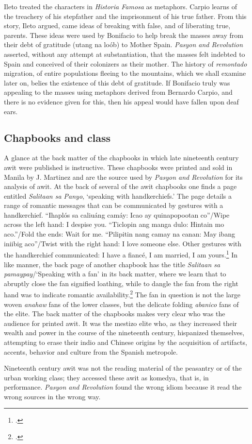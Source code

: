 Ileto treated the characters in \textit{Historia Famosa} as metaphors. Carpio learns of the treachery of his stepfather and the imprisonment of his true father. From this story, Ileto argued, came ideas of breaking with false, and of liberating true, parents. These ideas were used by Bonifacio to help break the masses away from their debt of gratitude (utang na lo\'ob) to Mother Spain. \textit{Pasyon and Revolution} asserted, without any attempt at substantiation, that the masses felt indebted to Spain and conceived of their colonizers as their mother. The history of \textit{remontado} migration, of entire populations fleeing to the mountains, which we shall examine later on, belies the existence of this debt of gratitude. If Bonifacio truly was appealing to the masses using metaphors derived from Bernardo Carpio, and there is no evidence given for this, then his appeal would have fallen upon deaf ears.

\subsection{Chapbooks and class}

A glance at the back matter of the chapbooks in which late nineteenth century awit were published is instructive. These chapbooks were printed and sold in Manila by J. Martinez and are the source used by \textit{Pasyon and Revolution} for its analysis of awit. At the back of several of the awit chapbooks one finds a page entitled \textit{Salitaan sa Panyo}, \enquote*{speaking with handkerchiefs.} The page details a range of romantic messages that can be communicated by gestures with a handkerchief. \enquote{Ihapl\'os sa caliu\'ang cam\'ay: Icao ay quinapopootan co}/Wipe across the left hand: I despise you. \enquote{Ticlopin ang manga dulo: Hintain mo aco.}/Fold the ends: Wait for me. \enquote{Pilipitin nang camay na canan: May ibang iniibig aco}/Twist with the right hand: I love someone else. Other gestures with the handkerchief communicated: I have a fianc\'e, I am married, I am yours.\footcite{Buhay1916}  In like manner, the back page of another chapbook has the title \textit{Salitaan sa pamaypay}/\enquote*{Speaking with a fan} in its back matter, where we learn that to abruptly close the fan signified loathing, while to dangle the fan from the right hand was to indicate romantic availability.\footcite{Calaguim1923} The fan in question is not the large woven \textit{anahaw} fans of the lower classes, but the delicate folding \textit{abanico} fans of the elite. The back matter of the chapbooks makes very clear who was the audience for printed awit. It was the mestizo elite who, as they increased their wealth and power in the course of the nineteenth century, hispanized themselves, attempting to erase their indio and Chinese origins by the acquisition of artifacts, accents, behavior and culture from the Spanish metropole.

Nineteenth century awit was not the reading material of the peasantry or of the urban working class; they accessed these awit as komedya, that is, in performance. \textit{Pasyon and Revolution} found the wrong idiom because it read the wrong sources in the wrong way. 
